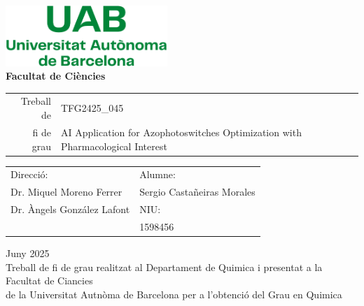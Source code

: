 \documentclass[11pt]{article}
\newcommand\NomComplet{Sergio Castañeiras Morales}
\newcommand\NIU{1598456}
\newcommand\NomProfeA{Dr. Miquel Moreno Ferrer}
\newcommand\NomProfeB{Dr. Àngels González Lafont}
\newcommand\CodiTFG{TFG2425\_045}
\newcommand\TitolTFG{AI Application for Azophotoswitches Optimization with Pharmacological Interest}
\newcommand\NomCentre{Departament de Quimica } %
\newcommand\NomGrau{Quimica}
\newcommand\Mes{Juny } %
\newcommand\Any{2025}
\begin{document}
\begin{titlepage}

\center %


\includegraphics[width = 6.1cm]{GeneralSources/Logo_uab.pdf}\\[1.76cm] %


\textbf{\LARGE Facultat de Ciències}\\[3.53cm] %
\begin{flushright}
\begin{tabular}{r | p{}}
  {\Large Treball de} & {\LARGE \CodiTFG}\\
  {\LARGE fi de grau}  & {\LARGE \TitolTFG}
\end{tabular}
\end{flushright}\vspace{5.06cm}




\begin{tabular}{p{} p{}}
\large
Direcció: & Alumne: \\
\NomProfeA & \NomComplet\\
\NomProfeB & NIU: \\
 & \NIU
\end{tabular}
\vspace{0.5cm}



{\Large \Mes \Any}\\[0.5cm] %

Treball de fi de grau realitzat al \NomCentre i presentat a la\\ Facultat de Ciancies\\ de la Universitat Autnòma de Barcelona per a l'obtenció del Grau en \NomGrau


\end{titlepage}
\end{document}
